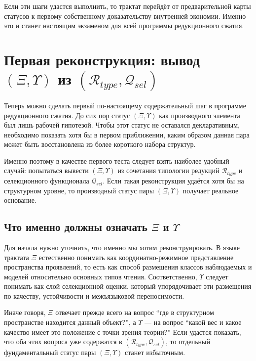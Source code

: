 \documentclass[12pt,a4paper]{article}
\begin{document}
Если эти шаги удастся выполнить, то трактат перейдёт от предварительной карты статусов к первому собственному доказательству внутренней экономии. Именно это и станет настоящим экзаменом для всей программы редукционного сжатия.

\section{Первая реконструкция: вывод \texorpdfstring{$(\Xi,\Upsilon)$}{(Xi,Upsilon)} из \texorpdfstring{$(\mathcal{R}_{type},\mathcal{Q}_{sel})$}{(Rtype,Qsel)}}

Теперь можно сделать первый по-настоящему содержательный шаг в программе редукционного сжатия. До сих пор статус \((\Xi,\Upsilon)\) как производного элемента был лишь рабочей гипотезой. Чтобы этот статус не оставался декларативным, необходимо показать хотя бы в первом приближении, каким образом данная пара может быть восстановлена из более короткого набора структур.

Именно поэтому в качестве первого теста следует взять наиболее удобный случай: попытаться вывести \((\Xi,\Upsilon)\) из сочетания типологии редукций \(\mathcal{R}_{type}\) и селекционного функционала \(\mathcal{Q}_{sel}\). Если такая реконструкция удаётся хотя бы на структурном уровне, то производный статус пары \((\Xi,\Upsilon)\) получает реальное основание.

\subsection{Что именно должны означать \texorpdfstring{$\Xi$}{Xi} и \texorpdfstring{$\Upsilon$}{Upsilon}}

Для начала нужно уточнить, что именно мы хотим реконструировать. В языке трактата \(\Xi\) естественно понимать как координатно-режимное представление пространства проявлений, то есть как способ размещения классов наблюдаемых и моделей относительно основных типов чтения. Соответственно, \(\Upsilon\) следует понимать как слой селекционной оценки, который упорядочивает эти размещения по качеству, устойчивости и межъязыковой переносимости.

Иначе говоря, \(\Xi\) отвечает прежде всего на вопрос ``где в структурном пространстве находится данный объект?'', а \(\Upsilon\) --- на вопрос ``какой вес и какое качество имеет это положение с точки зрения теории?'' Если удастся показать, что оба этих вопроса уже содержатся в \((\mathcal{R}_{type},\mathcal{Q}_{sel})\), то отдельный фундаментальный статус пары \((\Xi,\Upsilon)\) станет избыточным.
\end{document}
